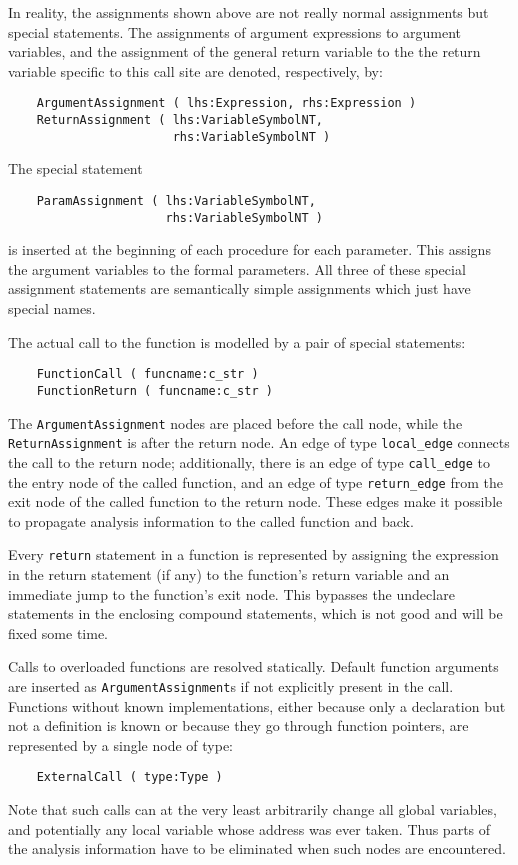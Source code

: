 \documentclass[12pt]{article}
\begin{document}

In reality, the assignments shown above are not really normal
assignments but special statements. The assignments of argument
expressions to argument variables, and the assignment of the general
return variable to the the return variable specific to this call
site are denoted, respectively, by:
\begin{verbatim}
    ArgumentAssignment ( lhs:Expression, rhs:Expression )
    ReturnAssignment ( lhs:VariableSymbolNT,
                       rhs:VariableSymbolNT )
\end{verbatim}

The special statement
\begin{verbatim}
    ParamAssignment ( lhs:VariableSymbolNT,
                      rhs:VariableSymbolNT )
\end{verbatim}
is inserted at the beginning of each procedure for each parameter.
This assigns the argument variables to the formal parameters. All
three of these special assignment statements are semantically simple
assignments which just have special names.

The actual call to the function is modelled by a pair of special
statements:
\begin{verbatim}
    FunctionCall ( funcname:c_str )
    FunctionReturn ( funcname:c_str )
\end{verbatim}
The \verb|ArgumentAssignment| nodes are placed before the call node,
while the \verb|ReturnAssignment| is after the return node. An edge
of type \verb|local_edge| connects the call to the return node;
additionally, there is an edge of type \verb|call_edge| to the entry
node of the called function, and an edge of type \verb|return_edge|
from the exit node of the called function to the return node. These
edges make it possible to propagate analysis information to the
called function and back.

Every \lstinline|return| statement in a function is represented by
assigning the expression in the return statement (if any) to the
function's return variable and an immediate jump to the function's
exit node. This bypasses the undeclare statements in the enclosing
compound statements, which is not good and will be fixed some time.

Calls to overloaded functions are resolved statically. Default
function arguments are inserted as \verb|ArgumentAssignment|s if not
explicitly present in the call. Functions without known
implementations, either because only a declaration but not a
definition is known or because they go through function pointers,
are represented by a single node of type:
\begin{verbatim}
    ExternalCall ( type:Type )
\end{verbatim}
Note that such calls can at the very least arbitrarily change all
global variables, and potentially any local variable whose address
was ever taken. Thus parts of the analysis information have to be
eliminated when such nodes are encountered.
\end{document}
